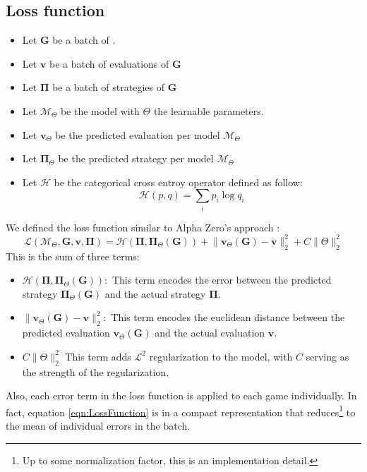 \subsection{Loss function}
\begin{itemize}
	\item Let $\boldsymbol{G}$ be a batch of .
	\item Let $\boldsymbol{v}$ be a batch of evaluations of $\boldsymbol{G}$ 
	\item Let $\boldsymbol{\Pi}$ be a batch of strategies of $\boldsymbol{G}$
	\item Let $\mathcal{M}_{\Theta}$ be the model with $\Theta$ the learnable parameters.
	\item Let $\boldsymbol{v}_{\Theta}$ be the predicted evaluation per model $\mathcal{M}_{\Theta}$
	\item Let $\boldsymbol{\Pi}_{\Theta}$ be the predicted strategy per model $\mathcal{M}_{\Theta}$ 
	\item Let $\mathcal{H}$ be the categorical cross entroy operator defined as follow:
	\begin{equation*}
		\mathcal{H}(p,q) = \sum_{i}p_i \log q_i 
	\end{equation*}
\end{itemize}
We defined the loss function similar to Alpha Zero's approach \cite{AlphaZero}:
\begin{equation}
	\label{eqn:LossFunction}
	\mathcal{L}(\mathcal{M}_{\Theta},\boldsymbol{G},\boldsymbol{v},\boldsymbol{\Pi}) = \mathcal{H}(\boldsymbol{\Pi},\boldsymbol{\Pi}_\Theta(\boldsymbol{G})) + \lVert \boldsymbol{v}_{\Theta}(\boldsymbol{G})- \boldsymbol{v} \rVert_2^2 +  C \lVert \Theta \rVert_2^2
\end{equation}
This is the sum of three terms:
\begin{itemize}
	\item $\displaystyle \mathcal{H}(\boldsymbol{\Pi},\boldsymbol{\Pi}_\Theta(\boldsymbol{G})):$ This term encodes the error between the predicted strategy $\boldsymbol{\Pi}_\Theta(\boldsymbol{G})$ and the actual strategy $\boldsymbol{\Pi}$.
	\item $\displaystyle \lVert \boldsymbol{v}_{\Theta}(\boldsymbol{G})- \boldsymbol{v} \rVert_2^2:$ This term encodes the euclidean distance between the predicted evaluation $\boldsymbol{v}_{\Theta}(\boldsymbol{G})$ and the actual evaluation $\boldsymbol{v}$.
	\item $\displaystyle C \lVert \Theta \rVert_2^2$ This term adds $\mathscr{L}^2$ regularization to the model, with $C$ serving as the strength of the regularization.
\end{itemize}
Also, each error term in the loss function is applied to each game individually. In fact, equation \eqref{eqn:LossFunction} is in a compact representation that reduces\footnote{Up to some normalization factor, this is an implementation detail.} to the mean of individual errors in the batch.
